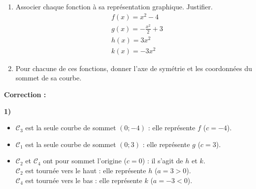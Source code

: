 \documentclass[11pt,a4paper]{book}
\begin{document}
\exerciceDS{}

\begin{minipage}[c]{0.40\linewidth}
	\begin{enumerate}[label=\textbf{\arabic*)}]
		\item Associer chaque fonction à sa représentation graphique. Justifier.
		$$
		\begin{aligned}
			& f(x)=x^{2}-4 \\
			& g(x)=-\frac{x^{2}}{2}+3 \\
			& h(x)=3x^{2} \\
			& k(x)=-3x^{2}
		\end{aligned}
		$$
		\item Pour chacune de ces fonctions, donner l'axe de symétrie et les coordonnées du sommet de sa courbe.
	\end{enumerate}
\end{minipage} \hfill
\begin{minipage}[c]{0.56\linewidth}
	\begin{center}
	\end{center}
\end{minipage}

\medskip
\noindent\textbf{\color{red!75!black}Correction :}

\smallskip
\begin{corrBox}
	\textbf{1)}
	\begin{itemize}
		\item $\mathcal{C}_3$ est la seule courbe de sommet $(0 ; -4)$ : elle représente $f$ ($c=-4$).
		\item $\mathcal{C}_1$ est la seule courbe de sommet $(0 ; 3)$ : elle représente $g$ ($c=3$).
		\item $\mathcal{C}_2$ et $\mathcal{C}_4$ ont pour sommet l'origine ($c=0$) : il s'agit de $h$ et $k$.\\
		$\mathcal{C}_2$ est tournée vers le haut : elle représente $h$ ($a=3>0$).\\
		$\mathcal{C}_4$ est tournée vers le bas : elle représente $k$ ($a=-3<0$).
	\end{itemize}
\end{corrBox}
\end{document}
